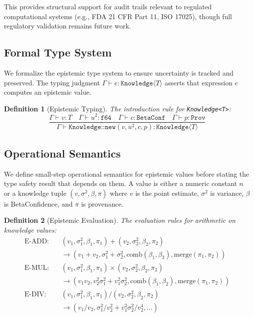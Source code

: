 \documentclass[11pt,a4paper]{article}
\newtheorem{definition}{Definition}
\begin{document}
This provides structural support for audit trails relevant to regulated
computational systems (e.g., FDA 21 CFR Part 11, ISO 17025), though
full regulatory validation remains future work.

\subsection{Formal Type System}

We formalize the epistemic type system to ensure uncertainty is tracked and
preserved. The typing judgment $\Gamma \vdash e : \texttt{Knowledge}\langle T \rangle$
asserts that expression $e$ computes an epistemic value.

\begin{definition}[Epistemic Typing]
The introduction rule for \texttt{Knowledge<T>}:
\[
\frac{\Gamma \vdash v : T \quad \Gamma \vdash u^2 : \texttt{f64} \quad \Gamma \vdash c : \texttt{BetaConf} \quad \Gamma \vdash p : \texttt{Prov}}
     {\Gamma \vdash \texttt{Knowledge::new}(v, u^2, c, p) : \texttt{Knowledge}\langle T \rangle}
\]
\end{definition}

\subsection{Operational Semantics}

We define small-step operational semantics for epistemic values before
stating the type safety result that depends on them. A value
is either a numeric constant $n$ or a knowledge tuple $(v, \sigma^2, \beta, \pi)$
where $v$ is the point estimate, $\sigma^2$ is variance, $\beta$ is BetaConfidence, and $\pi$ is provenance.

\begin{definition}[Epistemic Evaluation]
The evaluation rules for arithmetic on knowledge values:
\begin{align}
  \text{E-ADD:} \quad & (v_1, \sigma_1^2, \beta_1, \pi_1) + (v_2, \sigma_2^2, \beta_2, \pi_2) \nonumber \\
    & \to (v_1{+}v_2, \sigma_1^2{+}\sigma_2^2, \text{comb}(\beta_1,\beta_2), \text{merge}(\pi_1,\pi_2)) \\[0.5em]
  \text{E-MUL:} \quad & (v_1, \sigma_1^2, \beta_1, \pi_1) \times (v_2, \sigma_2^2, \beta_2, \pi_2) \nonumber \\
    & \to (v_1 v_2, v_2^2\sigma_1^2 {+} v_1^2\sigma_2^2, \text{comb}(\beta_1,\beta_2), \text{merge}(\pi_1,\pi_2)) \\[0.5em]
  \text{E-DIV:} \quad & (v_1, \sigma_1^2, \beta_1, \pi_1) / (v_2, \sigma_2^2, \beta_2, \pi_2) \nonumber \\
    & \to (v_1/v_2, \sigma_1^2/v_2^2 {+} v_1^2\sigma_2^2/v_2^4, \ldots)
\end{align}
\end{definition}
\end{document}
